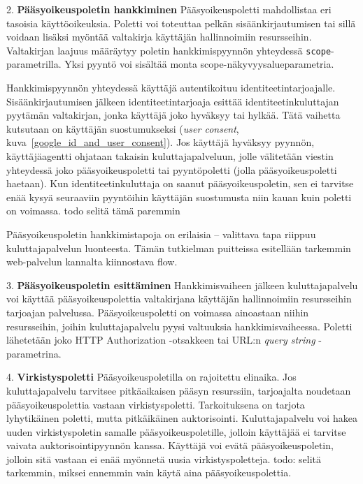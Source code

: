\documentclass[finnish,gradu]{tktltiki}
\begin{document}
  2. \textbf{Pääsyoikeuspoletin hankkiminen}
  Pääsyoikeuspoletti mahdollistaa eri tasoisia käyttöoikeuksia. Poletti voi toteuttaa pelkän sisäänkirjautumisen tai sillä voidaan lisäksi myöntää valtakirja käyttäjän hallinnoimiin resursseihin. Valtakirjan laajuus määräytyy poletin hankkimispyynnön yhteydessä \verb!scope!-parametrilla. Yksi pyyntö voi sisältää monta scope-näkyvyysalueparametria.

  Hankkimispyynnön yhteydessä käyttäjä autentikoituu identiteetintarjoajalle. Sisäänkirjautumisen jälkeen identiteetintarjoaja esittää identiteetinkuluttajan pyytämän valtakirjan, jonka käyttäjä joko hyväksyy tai hylkää. Tätä vaihetta kutsutaan on käyttäjän suostumukseksi (\emph{user consent}, kuva~\ref{google_id_and_user_consent}). Jos käyttäjä hyväksyy pyynnön, käyttäjäagentti ohjataan takaisin kuluttajapalveluun, jolle välitetään viestin yhteydessä joko pääsyoikeuspoletti tai pyyntöpoletti (jolla pääsyoikeuspoletti haetaan). Kun identiteetinkuluttaja on saanut pääsyoikeuspoletin, sen ei tarvitse enää kysyä seuraaviin pyyntöihin käyttäjän suostumusta niin kauan kuin poletti on voimassa. todo selitä tämä paremmin

  Pääsyoikeuspoletin hankkimistapoja on erilaisia -- valittava tapa riippuu kuluttajapalvelun luonteesta.
  Tämän tutkielman puitteissa esitellään tarkemmin web-palvelun kannalta kiinnostava flow.

  3. \textbf{Pääsyoikeuspoletin esittäminen}
  Hankkimisvaiheen jälkeen kuluttajapalvelu voi käyttää pääsyoikeuspolettia valtakirjana käyttäjän hallinnoimiin resursseihin tarjoajan palvelussa. Pääsyoikeuspoletti on voimassa ainoastaan niihin resursseihin, joihin kuluttajapalvelu pyysi valtuuksia hankkimisvaiheessa. Poletti lähetetään joko HTTP Authorization -otsakkeen tai URL:n \emph{query string} -parametrina.

  4. \textbf{Virkistyspoletti}
  Pääsyoikeuspoletilla on rajoitettu elinaika. Jos kuluttajapalvelu tarvitsee pitkäaikaisen pääsyn resurssiin, tarjoajalta noudetaan pääsyoikeuspolettia vastaan virkistyspoletti. Tarkoituksena on tarjota lyhytikäinen poletti, mutta pitkäikäinen auktorisointi. Kuluttajapalvelu voi hakea uuden virkistyspoletin samalle pääsyoikeuspoletille, jolloin käyttäjää ei tarvitse vaivata auktorisointipyynnön kanssa. Käyttäjä voi evätä pääsyoikeuspoletin, jolloin sitä vastaan ei enää myönnetä uusia virkistyspoletteja.    todo: selitä tarkemmin, miksei ennemmin vain käytä aina pääsyoikeuspolettia.
\end{document}

